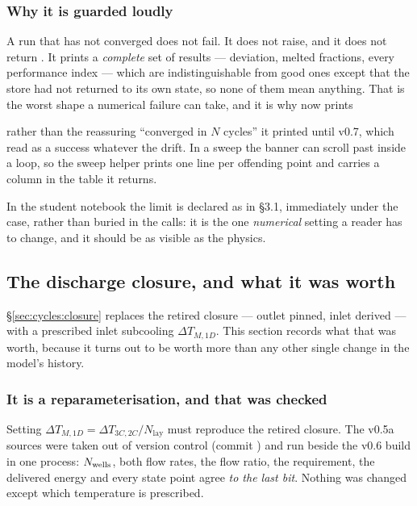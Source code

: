 \subsubsection*{Why it is guarded loudly}

A run that has not converged does not fail. It does not raise, and it does not
return . It prints a \emph{complete} set of results --- deviation,
melted fractions, every performance index --- which are indistinguishable from
good ones except that the store had not returned to its own state, so none of
them mean anything. That is the worst shape a numerical failure can take, and it
is why  now prints

\begin{center}
\end{center}

\noindent
rather than the reassuring ``converged in $N$ cycles'' it printed until v0.7,
which read as a success whatever the drift. In a sweep the banner can scroll past
inside a loop, so the sweep helper prints one line per offending point and
carries a  column in the table it returns.

In the student notebook the limit is declared as  in
\S3.1, immediately under the case, rather than buried in the calls: it is the one
\emph{numerical} setting a reader has to change, and it should be as visible as
the physics.

\subsection{The discharge closure, and what it was worth}
\label{sec:cyclic:closure}

\S\ref{sec:cycles:closure} replaces the retired closure --- outlet pinned, inlet
derived --- with a prescribed inlet subcooling $\Delta T_{M,1D}$. This section
records what that was worth, because it turns out to be worth more than any
other single change in the model's history.

\subsubsection*{It is a reparameterisation, and that was checked}

Setting $\Delta T_{M,1D}=\Delta T_{3C,2C}/N_{\mathrm{lay}}$ must reproduce the
retired closure. The v0.5a sources were taken out of version control
(commit ) and run beside the v0.6 build in one process: $N_{\mathrm{wells}}$,
both flow rates, the flow ratio, the requirement, the delivered energy and every
state point agree \emph{to the last bit}. Nothing was changed except which
temperature is prescribed.

